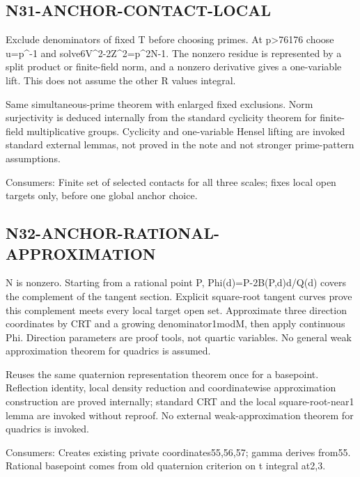 \documentclass{article}
\begin{document}
\subsection{N31-ANCHOR-CONTACT-LOCAL}
\label{outline:r4-n31-anchor-contact-local}
Exclude denominators of fixed T before choosing primes. At p>76176 choose u=p\textasciicircum{}-1 and solve6V\textasciicircum{}2-2Z\textasciicircum{}2=p\textasciicircum{}2N-1. The nonzero residue is represented by a split product or finite-field norm, and a nonzero derivative gives a one-variable lift. This does not assume the other R values integral.
\par Same simultaneous-prime theorem with enlarged fixed exclusions. Norm surjectivity is deduced internally from the standard cyclicity theorem for finite-field multiplicative groups. Cyclicity and one-variable Hensel lifting are invoked standard external lemmas, not proved in the note and not stronger prime-pattern assumptions.
\par Consumers: Finite set of selected contacts for all three scales; fixes local open targets only, before one global anchor choice.
\subsection{N32-ANCHOR-RATIONAL-APPROXIMATION}
\label{outline:r4-n32-anchor-rational-approximation}
N is nonzero. Starting from a rational point P, Phi(d)=P-2B(P,d)d/Q(d) covers the complement of the tangent section. Explicit square-root tangent curves prove this complement meets every local target open set. Approximate three direction coordinates by CRT and a growing denominator1modM, then apply continuous Phi. Direction parameters are proof tools, not quartic variables. No general weak approximation theorem for quadrics is assumed.
\par Reuses the same quaternion representation theorem once for a basepoint. Reflection identity, local density reduction and coordinatewise approximation construction are proved internally; standard CRT and the local square-root-near1 lemma are invoked without reproof. No external weak-approximation theorem for quadrics is invoked.
\par Consumers: Creates existing private coordinates55,56,57; gamma derives from55. Rational basepoint comes from old quaternion criterion on t integral at2,3.
\end{document}
